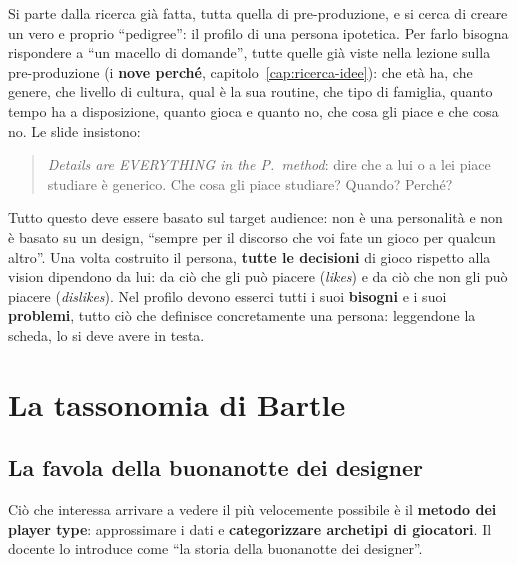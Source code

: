 Si parte dalla ricerca già fatta, tutta quella di pre-produzione, e si cerca di
creare un vero e proprio ``pedigree'': il profilo di una persona ipotetica. Per
farlo bisogna rispondere a ``un macello di domande'', tutte quelle già viste nella
lezione sulla pre-produzione (i \textbf{nove perché}, capitolo~\ref{cap:ricerca-idee}):
che età ha, che genere, che livello di cultura, qual è la sua routine, che tipo di
famiglia, quanto tempo ha a disposizione, quanto gioca e quanto no, che cosa gli
piace e che cosa no. Le slide insistono:
\begin{quote}
\emph{Details are EVERYTHING in the P.\ method}: dire che a lui o a lei piace
studiare è generico. Che cosa gli piace studiare? Quando? Perché?
\end{quote}

Tutto questo deve essere basato sul target audience: non è una personalità e non è
basato su un design, ``sempre per il discorso che voi fate un gioco per qualcun
altro''. Una volta costruito il persona, \textbf{tutte le decisioni} di gioco
rispetto alla vision dipendono da lui: da ciò che gli può piacere (\emph{likes}) e
da ciò che non gli può piacere (\emph{dislikes}). Nel profilo devono esserci tutti i
suoi \textbf{bisogni} e i suoi \textbf{problemi}, tutto ciò che definisce
concretamente una persona: leggendone la scheda, lo si deve avere in testa.

\section{La tassonomia di Bartle}
\label{gd18:sec:bartle}

\subsection{La favola della buonanotte dei designer}

Ciò che interessa arrivare a vedere il più velocemente possibile è il \textbf{metodo
dei player type}: approssimare i dati e \textbf{categorizzare archetipi di
giocatori}. Il docente lo introduce come ``la storia della buonanotte dei
designer''.

